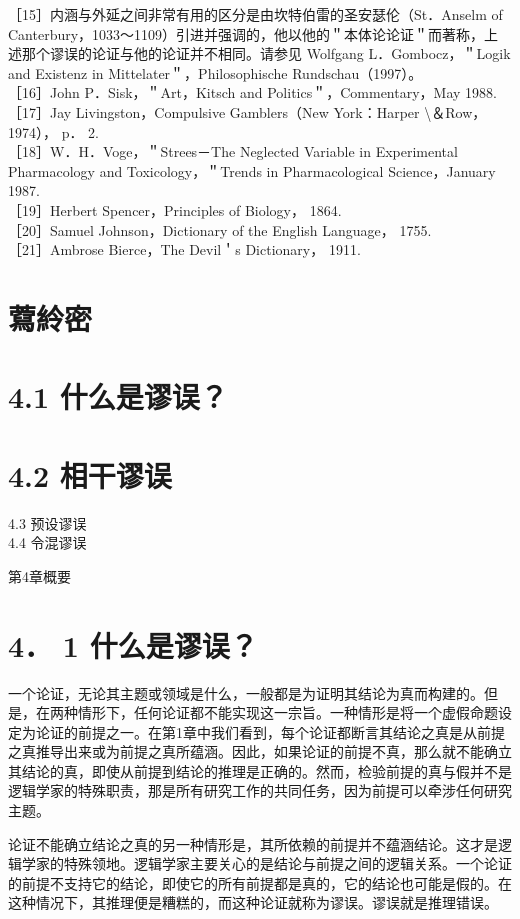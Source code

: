 ［15］内涵与外延之间非常有用的区分是由坎特伯雷的圣安瑟伦（St．Anselm of Canterbury，1033～1109）引进并强调的，他以他的＂本体论论证＂而著称，上述那个谬误的论证与他的论证并不相同。请参见 Wolfgang L．Gombocz，＂Logik and Existenz in Mittelater＂，Philosophische Rundschau（1997）。\\
［16］John P．Sisk，＂Art，Kitsch and Politics＂，Commentary，May 1988.\\
［17］Jay Livingston，Compulsive Gamblers（New York：Harper \textbackslash ＆Row，1974）， p． 2.\\
［18］W．H．Voge，＂Strees－The Neglected Variable in Experimental Pharmacology and Toxicology，＂Trends in Pharmacological Science，January 1987.\\
［19］Herbert Spencer，Principles of Biology， 1864.\\
［20］Samuel Johnson，Dictionary of the English Language， 1755.\\
［21］Ambrose Bierce，The Devil＇s Dictionary， 1911.

\section*{藛紷密}
\section*{4.1 什么是谬误？}
\section*{4.2 相干谬误 }
4.3 预设谬误\\
4.4 令混谬误

第4章概要

\section*{4． 1 什么是谬误？}
一个论证，无论其主题或领域是什么，一般都是为证明其结论为真而构建的。但是，在两种情形下，任何论证都不能实现这一宗旨。一种情形是将一个虚假命题设定为论证的前提之一。在第1章中我们看到，每个论证都断言其结论之真是从前提之真推导出来或为前提之真所蕴涵。因此，如果论证的前提不真，那么就不能确立其结论的真，即使从前提到结论的推理是正确的。然而，检验前提的真与假并不是逻辑学家的特殊职责，那是所有研究工作的共同任务，因为前提可以牵涉任何研究主题。

论证不能确立结论之真的另一种情形是，其所依赖的前提并不蕴涵结论。这才是逻辑学家的特殊领地。逻辑学家主要关心的是结论与前提之间的逻辑关系。一个论证的前提不支持它的结论，即使它的所有前提都是真的，它的结论也可能是假的。在这种情况下，其推理便是糟糕的，而这种论证就称为谬误。谬误就是推理错误。

